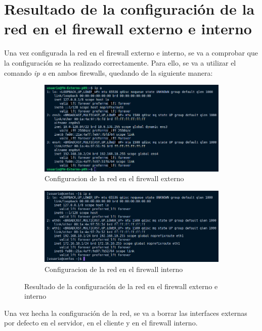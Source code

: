 \documentclass[11pt]{report}
\begin{document}

\section{Resultado de la configuración de la red en el firewall externo e interno}
Una vez configurada la red en el firewall externo e interno, se va a comprobar que la configuración
se ha realizado correctamente. Para ello, se va a utilizar el comando \emph{ip a} en ambos firewalls,
quedando de la siguiente manera:
\begin{figure}[H]
  \begin{subfigure}{0.5\textwidth}
    \centering
    \includegraphics[scale=0.35]{img/ip_a_fw_externo.png}
    \caption{Configuracion de la red en el firewall externo}
  \end{subfigure}%
  \begin{subfigure}{0.5\textwidth}
    \centering
    \includegraphics[scale=0.38]{img/ip_a_fw_interno.png}
    \caption{Configuracion de la red en el firewall interno}
  \end{subfigure}
  \caption{Resultado de la configuración de la red en el firewall externo e interno}
\end{figure}

Una vez hecha la configuración de la red, se va a borrar las interfaces externas por defecto
en el servidor, en el cliente y en el firewall interno.
\end{document}
